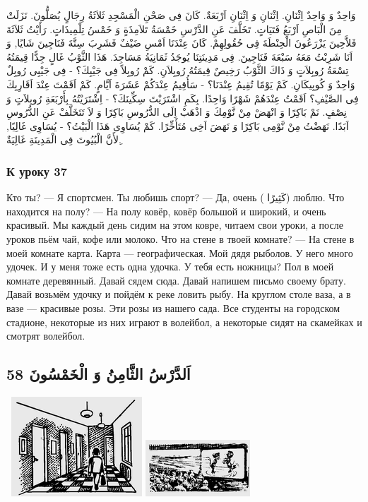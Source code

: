 \documentclass[a5paper]{article}
\begin{document}
وَاحِدٌ وَ وَاحِدٌ اِثْنَانِ. اِثْنَانِ وَ اِثْنَانِ اَرْبَعَةٌ. كَانَ فِى صَحْنِ الْمَسْجِدِ ثَلاَثَةُ رِجَالٍ يُصَلُّونَ. نَزَلَتْ مِنَ الْبَاصِ اَرْبَعُ فَتَيَاتٍ. تَخَلَّفَ عَنِ الدَّرْسِ خَمْسَةُ تَلاَمِذَةٍ وَ خَمْسُ تِلْمِيذَاتٍ. رَأَيْتُ ثَلاَثَةَ فَلاَّحِينَ يَزْرَعُونَ الْحِنْطَةَ فِى حُقُولِهِمْ. كَانَ عِنْدَنَا اَمْسِ ضَيْفٌ فَشَرِبَ سِتَّةَ فَنَاجِينَ شَايًا, وَ اَنَا شَرِبْتُ مَعَهُ سَبْعَةَ فَنَاجِينَ. فِى مَدِينَتِنَا يُوجَدُ ثَمَانِيَةُ مَسَاجِدَ. هَذَا الثَّوْبُ غَالٍ جِدًّا قِيمَتُهُ تِسْعَةُ رُوبِلاَتٍ وَ ذَاكَ الثَّوْبُ رَخِيصٌ قِيمَتُهُ رُوبِلاَنِ. كَمْ رُوبِلاً فِى جَيْبِكَ؟ - فِى جَيْبِى رُوبِلٌ وَاحِدٌ وَ كُوبِيكَانِ. كَمْ يَوْمًا تُقِيمُ عِنْدَنَا؟ - سَأُقِيمُ عِنْدَكُمْ عَشَرَةَ اَيَّامٍ. كَمْ اَقَمْتَ عِنْدَ اَقَارِبِكَ فِى الصَّيْفِ؟ اَقَمْتُ عِنْدَهُمْ شَهْرًا وَاحِدًا. بِكَمِ اشْتَرَيْتَ سِكِّينَكَ؟ - اِشْتَرَيْتُهُ بِأَرْبَعَةِ رُوبِلاَتٍ وَ نِصْفٍ. نَمْ بَاكِرًا وَ انْهَضْ مِنْ نَّوْمِكَ وَ اذْهَبْ اِلَى الدُّرُوسِ بَاكِرًا وَ لاَ تَتَخَلَّفْ عَنِ الدُّرُوسِ اَبَدًا. نَهَضْتُ مِنْ نَّوْمِى بَاكِرًا وَ نَهَضَ اَخِى مُتَأَخِّرًا. كَمْ يُسَاوِى هَذَا الْبَيْتُ؟ - يُسَاوِى غَالِيًا, ِلأَنَّ الْبُيُوتَ فِى الْمَدِينَةِ غَالِيَةٌ.

\subsubsection{К уроку 37}
Кто ты? — Я спортсмен. Ты любишь спорт? — Да, очень ( كَثِيرًا) люблю. Что находится на полу? — На полу ковёр, ковёр большой и широкий, и очень красивый. Мы каждый день сидим на этом ковре, читаем свои уроки, а после уроков пьём чай, кофе или молоко. Что на стене в твоей комнате? — На стене в моей комнате карта. Карта — географическая. Мой дядя рыболов. У него много удочек. И у меня тоже есть одна удочка. У тебя есть ножницы? Пол в моей комнате деревянный. Давай сядем сюда. Давай напишем письмо своему брату. Давай возьмём удочку и пойдём к реке ловить рыбу. На круглом столе ваза, а в вазе — красивые розы. Эти розы из нашего сада. Все студенты на городском стадионе, некоторые из них играют в волейбол, а некоторые сидят на скамейках и смотрят волейбол.

\subsection{اَلدَّرْسُ الثَّامِنُ وَ الْخَمْسُونَ 58}
\  \includegraphics[width=1.9272in,height=1.4689in]{images/MuhammadBagauddinprettified-img190.png}   \includegraphics[width=1.5417in,height=0.8335in]{images/MuhammadBagauddinprettified-img191.png} 
\end{document}
